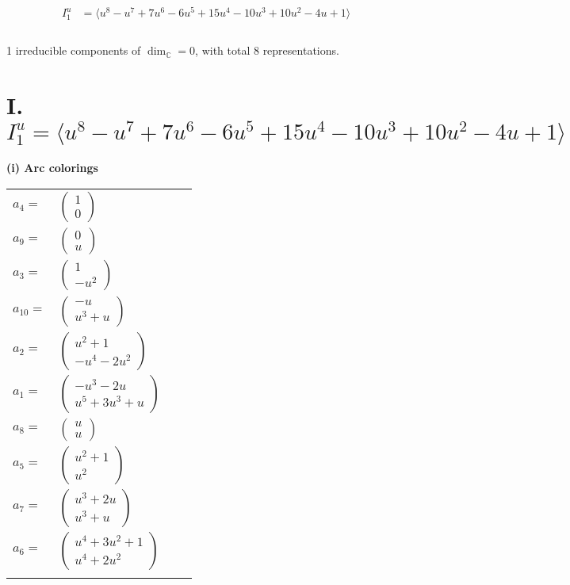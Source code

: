 \documentclass[1p]{elsarticle_modified}
\theoremstyle{definition}
\begin{document}
\begin{align*}
I^u_{1}&=\langle 
u^8- u^7+7 u^6-6 u^5+15 u^4-10 u^3+10 u^2-4 u+1\rangle \\
\\
\end{align*}
\raggedright * 1 irreducible components of $\dim_{\mathbb{C}}=0$, with total 8 representations.\\
\newpage
\renewcommand{\arraystretch}{1}
\centering \section*{I. $I^u_{1}= \langle u^8- u^7+7 u^6-6 u^5+15 u^4-10 u^3+10 u^2-4 u+1 \rangle$}
\flushleft \textbf{(i) Arc colorings}\\
\begin{tabular}{m{7pt} m{180pt} m{7pt} m{180pt} }
\flushright $a_{4}=$&$\begin{pmatrix}1\\0\end{pmatrix}$ \\
\flushright $a_{9}=$&$\begin{pmatrix}0\\u\end{pmatrix}$ \\
\flushright $a_{3}=$&$\begin{pmatrix}1\\- u^2\end{pmatrix}$ \\
\flushright $a_{10}=$&$\begin{pmatrix}- u\\u^3+u\end{pmatrix}$ \\
\flushright $a_{2}=$&$\begin{pmatrix}u^2+1\\- u^4-2 u^2\end{pmatrix}$ \\
\flushright $a_{1}=$&$\begin{pmatrix}- u^3-2 u\\u^5+3 u^3+u\end{pmatrix}$ \\
\flushright $a_{8}=$&$\begin{pmatrix}u\\u\end{pmatrix}$ \\
\flushright $a_{5}=$&$\begin{pmatrix}u^2+1\\u^2\end{pmatrix}$ \\
\flushright $a_{7}=$&$\begin{pmatrix}u^3+2 u\\u^3+u\end{pmatrix}$ \\
\flushright $a_{6}=$&$\begin{pmatrix}u^4+3 u^2+1\\u^4+2 u^2\end{pmatrix}$\\&\end{tabular}
\end{document}

